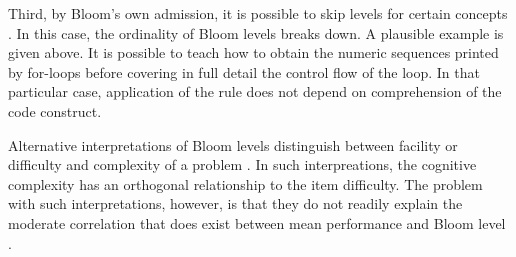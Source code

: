 Third, by Bloom's own admission, it is possible to skip levels for certain
concepts \cite{bloom1956}.  In this case, the ordinality of Bloom levels
breaks down.  A plausible example is given above.  It is possible to teach how
to obtain the numeric sequences printed by for-loops before covering in full
detail the control flow of the loop.  In that particular case, application of
the rule does not depend on comprehension of the code construct.

Alternative interpretations of Bloom levels distinguish between facility or
difficulty and complexity of a problem \cite{hill1981testing,
thompson2008bloom}.  In such interpreations, the cognitive complexity has an
orthogonal relationship to the item difficulty.  The problem with such
interpretations, however, is that they do not readily explain the moderate
correlation that does exist between mean performance and Bloom level
\cite{hill1981testing}.



